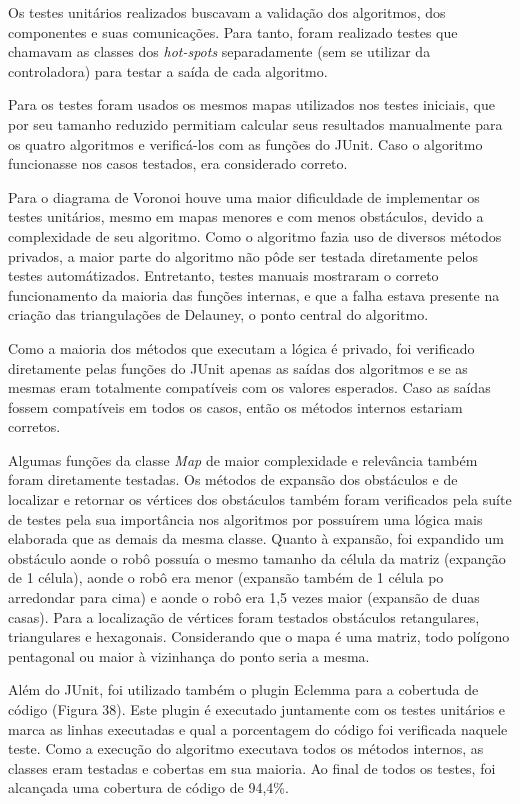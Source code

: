 Os testes unitários realizados buscavam a validação dos algoritmos, dos componentes e suas comunicações. Para tanto, foram realizado testes que chamavam as classes dos \textit{hot-spots} separadamente (sem se utilizar da controladora) para testar a saída de cada algoritmo.

Para os testes foram usados os mesmos mapas utilizados nos testes iniciais, que por seu tamanho reduzido permitiam calcular seus resultados manualmente para os quatro algoritmos e verificá-los com as funções do JUnit. Caso o algoritmo funcionasse nos casos testados, era considerado correto.

Para o diagrama de Voronoi houve uma maior dificuldade de implementar os testes unitários, mesmo em mapas menores e com menos obstáculos, devido a complexidade de seu algoritmo. Como o algoritmo fazia uso de diversos métodos privados, a maior parte do algoritmo não pôde ser testada diretamente pelos testes automátizados. Entretanto, testes manuais mostraram o correto funcionamento da maioria das funções internas, e que a falha estava presente na criação das triangulações de Delauney, o ponto central do algoritmo.

Como a maioria dos métodos que executam a lógica é privado, foi verificado diretamente pelas funções do JUnit apenas as saídas dos algoritmos e se as mesmas eram totalmente compatíveis com os valores esperados. Caso as saídas fossem compatíveis em todos os casos, então os métodos internos estariam corretos.

Algumas funções da classe \textit{Map} de maior complexidade e relevância também foram diretamente testadas. Os métodos de expansão dos obstáculos e de localizar e retornar os vértices dos obstáculos também foram verificados pela suíte de testes pela sua importância nos algoritmos por possuírem uma lógica mais elaborada que as demais da mesma classe. Quanto à expansão, foi expandido um obstáculo aonde o robô possuía o mesmo tamanho da célula da matriz (expanção de 1 célula), aonde o robô era menor (expansão também de 1 célula po arredondar para cima) e aonde o robô era 1,5 vezes maior (expansão de duas casas). Para a localização de vértices foram testados obstáculos retangulares, triangulares e hexagonais. Considerando que o mapa é uma matriz, todo polígono pentagonal ou maior à vizinhança do ponto seria a mesma.

Além do JUnit, foi utilizado também o plugin Eclemma para a cobertuda de código (Figura 38). Este plugin é executado juntamente com os testes unitários e marca as linhas executadas e qual a porcentagem do código foi verificada naquele teste. Como a execução do algoritmo executava todos os métodos internos, as classes eram testadas e cobertas em sua maioria. Ao final de todos os testes, foi alcançada uma cobertura de código de 94,4\%.

